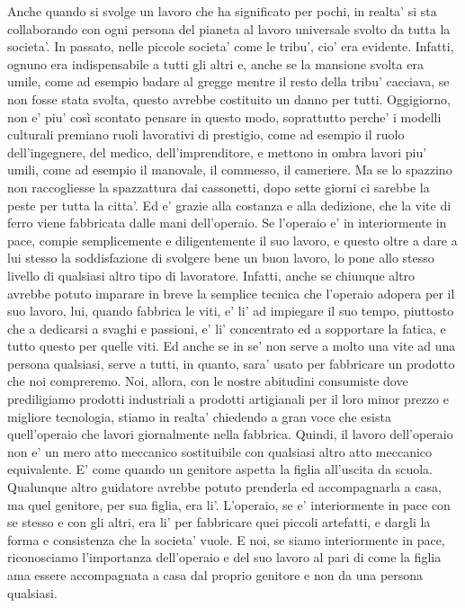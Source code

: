 Anche quando si svolge un lavoro che ha significato per pochi, in realta' si sta collaborando con ogni persona del pianeta al lavoro universale svolto da tutta la societa'. In passato, nelle piccole societa' come le tribu', cio' era evidente. Infatti, ognuno era indispensabile a tutti gli altri e, anche se la mansione svolta era umile, come ad esempio badare al gregge mentre il resto della tribu' cacciava,  se non fosse stata svolta, questo avrebbe costituito un danno per tutti. Oggigiorno, non e' piu' così scontato pensare in questo modo, soprattutto perche' i modelli culturali premiano ruoli lavorativi di prestigio, come ad esempio il ruolo dell'ingegnere, del medico, dell'imprenditore, e mettono in ombra lavori piu' umili, come ad esempio il manovale, il commesso, il cameriere. Ma se lo spazzino non raccogliesse la spazzattura dai cassonetti, dopo sette giorni ci sarebbe la peste per tutta la citta'. Ed e' grazie alla costanza e alla dedizione, che la vite di ferro viene fabbricata dalle mani dell'operaio. Se l'operaio e' in interiormente in pace, compie semplicemente e diligentemente il suo lavoro, e questo oltre a dare a lui stesso la soddisfazione di svolgere bene un buon lavoro, lo pone allo stesso livello di qualsiasi altro tipo di lavoratore. Infatti, anche se chiunque altro avrebbe potuto imparare in breve la semplice tecnica che l'operaio adopera per il suo lavoro, lui, quando fabbrica le viti, e' li' ad impiegare il suo tempo, piuttosto che a dedicarsi a svaghi e passioni, e' li' concentrato ed a sopportare la fatica, e tutto questo per quelle viti. Ed anche se in se' non serve a molto una vite ad una persona qualsiasi, serve a tutti, in quanto, sara' usato per fabbricare un prodotto che noi compreremo. Noi, allora, con le nostre abitudini consumiste dove prediligiamo prodotti industriali a prodotti artigianali per il loro minor prezzo e migliore tecnologia, stiamo in realta' chiedendo a gran voce che esista quell'operaio che lavori giornalmente nella fabbrica. Quindi, il lavoro dell'operaio non e' un mero atto meccanico sostituibile con qualsiasi altro atto meccanico equivalente. E' come quando un genitore aspetta la figlia all'uscita da scuola. Qualunque altro guidatore avrebbe potuto prenderla ed accompagnarla a casa, ma quel genitore, per sua figlia, era li'. L'operaio, se e' interiormente in pace con se stesso e con gli altri, era li' per fabbricare quei piccoli artefatti, e dargli la forma e consistenza che la societa' vuole. E noi, se siamo interiormente in pace, riconosciamo l'importanza dell'operaio e del suo lavoro al pari di come la figlia ama essere accompagnata a casa dal proprio genitore e non da una persona qualsiasi.


